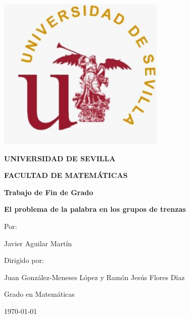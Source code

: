 \documentclass[twoside,12pt]{report}
\begin{document}
\begin{titlepage}
	\centering
		\includegraphics[width=8cm]{Imagenes/sello.jpeg}
		
	{\Large\bfseries UNIVERSIDAD DE SEVILLA\par}
	{\Large\bfseries FACULTAD DE MATEMÁTICAS\par}
	\vspace{0.5cm}
	{\large\bfseries Trabajo de Fin de Grado \par}
	\vspace{1cm}
	{\Huge\bfseries El problema de la palabra en los grupos de trenzas\par}
	\vspace{1cm}
	{\large Por:\par}
	{\large Javier Aguilar Martín\par}
	\vspace{0.5cm}
	{\large Dirigido por:\par}
	{\large Juan González-Meneses López y Ramón Jesús Flores Díaz\par}
	\vspace{1cm}
	{\large Grado en Matemáticas\par}
	\vspace{0.5cm}
	{\large \today\par}
	\vspace{1cm}





	
\end{titlepage}



\tableofcontents









\end{document}
